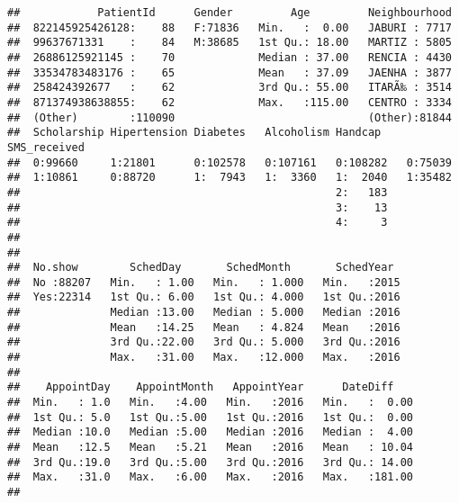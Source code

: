 \documentclass[]{article}
\newenvironment{Shaded}{\begin{snugshade}}{\end{snugshade}}
\newcommand{\KeywordTok}[1]{\textcolor[rgb]{0.13,0.29,0.53}{\textbf{#1}}}
\newcommand{\StringTok}[1]{\textcolor[rgb]{0.31,0.60,0.02}{#1}}
\newcommand{\OtherTok}[1]{\textcolor[rgb]{0.56,0.35,0.01}{#1}}
\newcommand{\OperatorTok}[1]{\textcolor[rgb]{0.81,0.36,0.00}{\textbf{#1}}}
\newcommand{\NormalTok}[1]{#1}
\begin{document}
\begin{Shaded}
\end{Shaded}

\begin{verbatim}
##            PatientId      Gender         Age         Neighbourhood  
##  822145925426128:    88   F:71836   Min.   :  0.00   JABURI : 7717  
##  99637671331    :    84   M:38685   1st Qu.: 18.00   MARTIZ : 5805  
##  26886125921145 :    70             Median : 37.00   RENCIA : 4430  
##  33534783483176 :    65             Mean   : 37.09   JAENHA : 3877  
##  258424392677   :    62             3rd Qu.: 55.00   ITARÃ‰ : 3514  
##  871374938638855:    62             Max.   :115.00   CENTRO : 3334  
##  (Other)        :110090                              (Other):81844  
##  Scholarship Hipertension Diabetes   Alcoholism Handcap    SMS_received
##  0:99660     1:21801      0:102578   0:107161   0:108282   0:75039     
##  1:10861     0:88720      1:  7943   1:  3360   1:  2040   1:35482     
##                                                 2:   183               
##                                                 3:    13               
##                                                 4:     3               
##                                                                        
##                                                                        
##  No.show        SchedDay       SchedMonth       SchedYear   
##  No :88207   Min.   : 1.00   Min.   : 1.000   Min.   :2015  
##  Yes:22314   1st Qu.: 6.00   1st Qu.: 4.000   1st Qu.:2016  
##              Median :13.00   Median : 5.000   Median :2016  
##              Mean   :14.25   Mean   : 4.824   Mean   :2016  
##              3rd Qu.:22.00   3rd Qu.: 5.000   3rd Qu.:2016  
##              Max.   :31.00   Max.   :12.000   Max.   :2016  
##                                                             
##    AppointDay    AppointMonth   AppointYear      DateDiff     
##  Min.   : 1.0   Min.   :4.00   Min.   :2016   Min.   :  0.00  
##  1st Qu.: 5.0   1st Qu.:5.00   1st Qu.:2016   1st Qu.:  0.00  
##  Median :10.0   Median :5.00   Median :2016   Median :  4.00  
##  Mean   :12.5   Mean   :5.21   Mean   :2016   Mean   : 10.04  
##  3rd Qu.:19.0   3rd Qu.:5.00   3rd Qu.:2016   3rd Qu.: 14.00  
##  Max.   :31.0   Max.   :6.00   Max.   :2016   Max.   :181.00  
## 
\end{verbatim}
\end{document}
